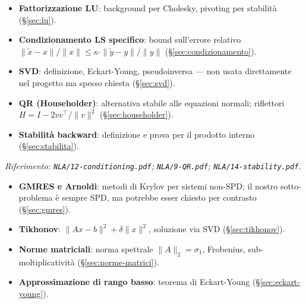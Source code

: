 \documentclass[11pt, a4paper, twoside]{book}
\theoremstyle{definition}
\theoremstyle{plain}
\theoremstyle{remark}
\begin{document}
\begin{tcolorbox}[enhanced, colback=cyan!8, colframe=cyan!60,
  title={\textbf{Livello 4 — Intorno NLA (esame orale, contesto numerico)}},
  fonttitle=\bfseries, breakable]
\begin{itemize}
  \item \textbf{Fattorizzazione LU}: background per Cholesky, pivoting per stabilità (\S\ref{sec:lu}).
  \item \textbf{Condizionamento LS specifico}: bound sull'errore relativo $\|\tilde x - x\|/\|x\| \leq \kappa \cdot \|\tilde y - y\|/\|y\|$ (\S\ref{sec:condizionamento}).
  \item \textbf{SVD}: definizione, Eckart-Young, pseudoinversa — non usata direttamente nel progetto ma spesso chiesta (\S\ref{sec:svd}).
  \item \textbf{QR (Householder)}: alternativa stabile alle equazioni normali; riflettori $H = I - 2vv^\top/\|v\|^2$ (\S\ref{sec:householder}).
  \item \textbf{Stabilità backward}: definizione e prova per il prodotto interno (\S\ref{sec:stabilita}).
\end{itemize}
\textit{Riferimento: \texttt{NLA/12-conditioning.pdf}; \texttt{NLA/9-QR.pdf}; \texttt{NLA/14-stability.pdf}.}
\end{tcolorbox}

\begin{tcolorbox}[enhanced, colback=yellow!8, colframe=yellow!60!black,
  title={\textbf{Livello 5 — Tutto il resto che potrebbe chiedere}},
  fonttitle=\bfseries, breakable]
\begin{itemize}
  \item \textbf{GMRES e Arnoldi}: metodi di Krylov per sistemi non-SPD; il nostro sotto-problema è sempre SPD, ma potrebbe esser chiesto per contrasto (\S\ref{sec:gmres}).
  \item \textbf{Tikhonov}: $\|Ax-b\|^2 + \delta\|x\|^2$, soluzione via SVD (\S\ref{sec:tikhonov}).
  \item \textbf{Norme matriciali}: norma spettrale $\|A\|_2 = \sigma_1$, Frobenius, sub-moltiplicatività (\S\ref{sec:norme-matrici}).
  \item \textbf{Approssimazione di rango basso}: teorema di Eckart-Young (\S\ref{sec:eckart-young}).
\end{itemize}
\end{tcolorbox}
\end{document}
